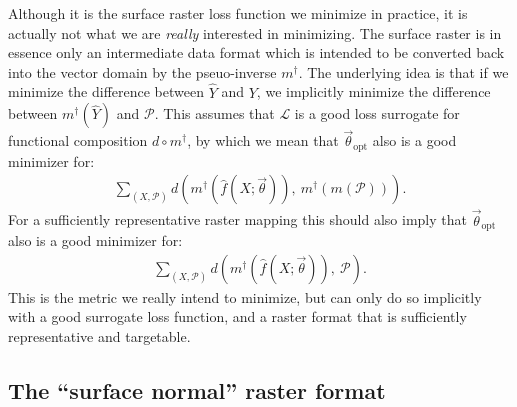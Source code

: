 Although it is the surface raster loss function we minimize in practice, it is actually not what we are \emph{really} interested in minimizing.
The surface raster is in essence only an intermediate data format which is intended to be converted back into the vector domain by the pseuo-inverse $m^{\dagger}$.
The underlying idea is that if we minimize the difference between $\hat{Y}$ and $Y$, we implicitly minimize the difference between $m^{\dagger}(\hat{Y})$ and $\mathcal{P}$.
This assumes that $\mathcal{L}$ is a good loss surrogate for functional composition $d \circ m^{\dagger}$, by which we mean that $\vec{\theta}_{\mathrm{opt}}$ also is a good minimizer for:
\begin{align*}
  \sum_{(X, \mathcal{P})}
  d\left(
    m^{\dagger}(\hat{f}(X; \vec{\theta})),~
    m^{\dagger}(m(\mathcal{P}))
  \right).
\end{align*}
For a sufficiently representative raster mapping this should also imply that $\vec{\theta}_{\mathrm{opt}}$ also is a good minimizer for:
\begin{align*}
  \sum_{(X, \mathcal{P})}
  d\left(
    m^{\dagger}(\hat{f}(X; \vec{\theta})),~
    \mathcal{P}
  \right).
\end{align*}
This is the metric we really intend to minimize, but can only do so implicitly with a good surrogate loss function, and a raster format that is sufficiently representative and targetable.

\subsection{The \enquote{surface normal} raster format}%
\label{sec:surface-normal-raster-format}

